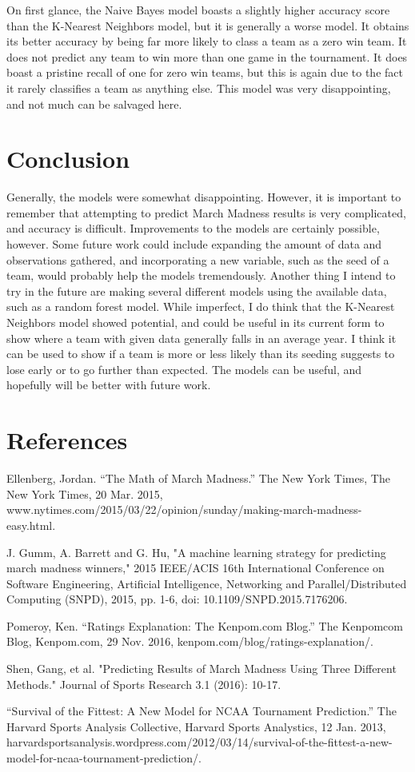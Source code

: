 \documentclass{article}
\begin{document}
On first glance, the Naive Bayes model boasts a slightly higher accuracy score than the K-Nearest Neighbors model, but it is generally a worse model. It obtains its better accuracy by being far more likely to class a team as a zero win team. It does not predict any team to win more than one game in the tournament. It does boast a pristine recall of one for zero win teams, but this is again due to the fact it rarely classifies a team as anything else. This model was very disappointing, and not much can be salvaged here. 

\section{Conclusion}
Generally, the models were somewhat disappointing. However, it is important to remember that attempting to predict March Madness results is very complicated, and accuracy is difficult. Improvements to the models are certainly possible, however. Some future work could include expanding the amount of data and observations gathered, and incorporating a new variable, such as the seed of a team, would probably help the models tremendously. Another thing I intend to try in the future are making several different models using the available data, such as a random forest model. While imperfect, I do think that the K-Nearest Neighbors model showed potential, and could be useful in its current form to show where a team with given data generally falls in an average year. I think it can be used to show if a team is more or less likely than its seeding suggests to lose early or to go further than expected. The models can be useful, and hopefully will be better with future work. 

\pagebreak
\section{References}


Ellenberg, Jordan. “The Math of March Madness.” The New York Times, The New York Times, 20 Mar. 2015, www.nytimes.com/2015/03/22/opinion/sunday/making-march-madness-easy.html.

J. Gumm, A. Barrett and G. Hu, "A machine learning strategy for predicting march madness winners," 2015 IEEE/ACIS 16th International Conference on Software Engineering, Artificial Intelligence, Networking and Parallel/Distributed Computing (SNPD), 2015, pp. 1-6, doi: 10.1109/SNPD.2015.7176206.

Pomeroy, Ken. “Ratings Explanation: The Kenpom.com Blog.” The Kenpomcom Blog, Kenpom.com, 29 Nov. 2016, kenpom.com/blog/ratings-explanation/. 

Shen, Gang, et al. "Predicting Results of March Madness Using Three Different Methods." Journal of Sports Research 3.1 (2016): 10-17.

“Survival of the Fittest: A New Model for NCAA Tournament Prediction.” The Harvard Sports Analysis Collective, Harvard Sports Analystics, 12 Jan. 2013, harvardsportsanalysis.wordpress.com/2012/03/14/survival-of-the-fittest-a-new-model-for-ncaa-tournament-prediction/. 
\end{document}
